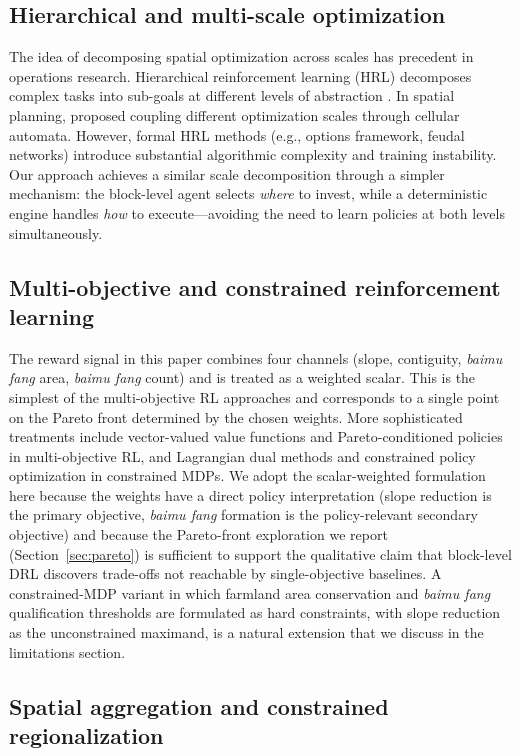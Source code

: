 \documentclass[preprint,12pt]{elsarticle}
\begin{document}
\subsection{Hierarchical and multi-scale optimization}

The idea of decomposing spatial optimization across scales has precedent in operations research. Hierarchical reinforcement learning (HRL) decomposes complex tasks into sub-goals at different levels of abstraction \citep{barto2003recent}. In spatial planning, \citet{li2011coupling} proposed coupling different optimization scales through cellular automata. However, formal HRL methods (e.g., options framework, feudal networks) introduce substantial algorithmic complexity and training instability. Our approach achieves a similar scale decomposition through a simpler mechanism: the block-level agent selects \textit{where} to invest, while a deterministic engine handles \textit{how} to execute---avoiding the need to learn policies at both levels simultaneously.

\subsection{Multi-objective and constrained reinforcement learning}

The reward signal in this paper combines four channels (slope, contiguity, \textit{baimu fang} area, \textit{baimu fang} count) and is treated as a weighted scalar. This is the simplest of the multi-objective RL approaches and corresponds to a single point on the Pareto front determined by the chosen weights. More sophisticated treatments include vector-valued value functions and Pareto-conditioned policies in multi-objective RL, and Lagrangian dual methods and constrained policy optimization in constrained MDPs. We adopt the scalar-weighted formulation here because the weights have a direct policy interpretation (slope reduction is the primary objective, \textit{baimu fang} formation is the policy-relevant secondary objective) and because the Pareto-front exploration we report (Section~\ref{sec:pareto}) is sufficient to support the qualitative claim that block-level DRL discovers trade-offs not reachable by single-objective baselines. A constrained-MDP variant in which farmland area conservation and \textit{baimu fang} qualification thresholds are formulated as hard constraints, with slope reduction as the unconstrained maximand, is a natural extension that we discuss in the limitations section.

\subsection{Spatial aggregation and constrained regionalization}
\end{document}
